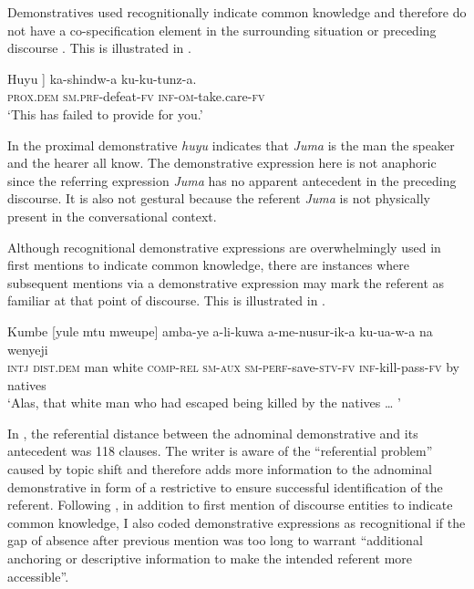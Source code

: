 \documentclass[output=paper,
modfonts
]{langscibook}
\begin{document}
Demonstratives used recognitionally indicate common knowledge and therefore do not have a co-specification element in the surrounding situation or preceding discourse \citep{Diessel1999}. This is illustrated in .

\ea\label{ex:mwamzandi:7}
\gll {\ob}Huyu ] ka-shindw-a ku-ku-tunz-a.\\
     {\db}\textsc{prox}.\textsc{dem}  \textsc{sm}.\textsc{prf}{}-defeat-\textsc{fv} \textsc{inf}{}-\textsc{om}{}-take.care-\textsc{fv}\\
\glt ‘This  has failed to provide for you.’
\z

In  the proximal demonstrative \textit{huyu} indicates that \textit{Juma} is the man the speaker and the hearer all know. The demonstrative expression here is not anaphoric since the referring expression \textit{Juma} has no apparent antecedent in the preceding discourse. It is also not gestural because the referent \textit{Juma} is not physically present in the conversational context.

Although recognitional demonstrative expressions are overwhelmingly used in first mentions to indicate common knowledge, there are instances where subsequent mentions via a demonstrative expression may mark the referent as familiar at that point of discourse. This is illustrated in .

\ea\label{ex:mwamzandi:8}
\gll  Kumbe [yule mtu mweupe] amba-ye a-li-kuwa a-me-nusur-ik-a ku-ua-w-a na wenyeji\\
     \textsc{intj} \textsc{dist}.\textsc{dem} man white \textsc{comp}{}-\textsc{rel} \textsc{sm}{}-\textsc{aux} \textsc{sm}{}-\textsc{perf}{}-save-\textsc{stv}{}-\textsc{fv} \textsc{inf}{}-kill-pass-\textsc{fv} by natives\\
\glt ‘Alas, that white man who had escaped being killed by the natives {\dots} ’
\z

In , the referential distance between the adnominal demonstrative and its antecedent was 118 clauses. The writer is aware of the “referential problem” \citep{Auer1984} caused by topic shift and therefore adds more information to the adnominal demonstrative in form of a restrictive  to ensure successful identification of the referent. Following \citet[230]{Himmelmann2006}, in addition to first mention of discourse entities to indicate common knowledge, I also coded demonstrative expressions as recognitional if the gap of absence after previous mention was too long to warrant “additional anchoring or descriptive information to make the intended referent more accessible”.
\end{document}
